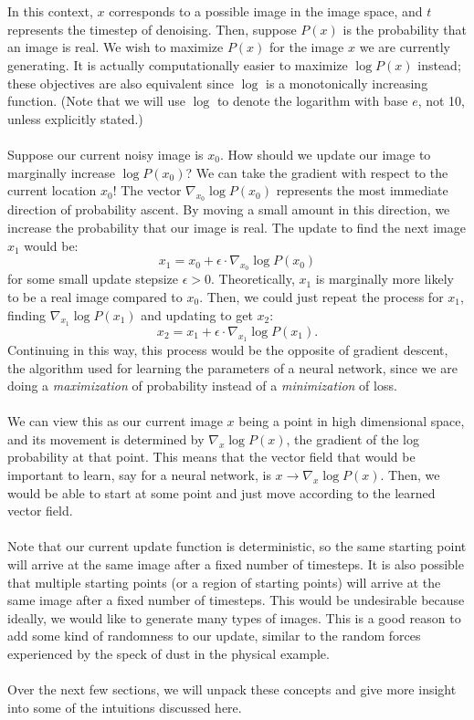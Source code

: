 \documentclass{article}
\begin{document}
\\
\\
In this context, $x$ corresponds to a possible image in the image space, and $t$ represents the timestep of denoising. Then, suppose $P(x)$ is the probability that an image is real. We wish to maximize $P(x)$ for the image $x$ we are currently generating. It is actually computationally easier to maximize $\log P(x)$ instead; these objectives are also equivalent since $\log$ is a monotonically increasing function. (Note that we will use $\log$ to denote the logarithm with base $e$, not 10, unless explicitly stated.)
\\
\\
Suppose our current noisy image is $x_0$. How should we update our image to marginally increase $\log P(x_0)$? We can take the gradient with respect to the current location $x_0$! The vector $\nabla_{x_0} \log P(x_0)$ represents the most immediate direction of probability ascent. By moving a small amount in this direction, we increase the probability that our image is real. The update to find the next image $x_1$ would be: 
\[x_1 = x_0 + \epsilon \cdot \nabla_{x_0} \log P(x_0)\]
for some small update stepsize $\epsilon > 0$. Theoretically, $x_1$ is marginally more likely to be a real image compared to $x_0$. Then, we could just repeat the process for $x_1$, finding $\nabla_{x_1} \log P(x_1)$ and updating to get $x_2$:
\[x_2 = x_1 + \epsilon \cdot \nabla_{x_1} \log P(x_1).\]
Continuing in this way, this process would be the opposite of gradient descent, the algorithm used for learning the parameters of a neural network, since we are doing a \textit{maximization} of probability instead of a \textit{minimization} of loss. 
\\
\\
We can view this as our current image $x$ being a point in high dimensional space, and its movement is determined by $\nabla_{x} \log P(x)$, the gradient of the log probability at that point. This means that the vector field that would be important to learn, say for a neural network, is $x\to \nabla_{x} \log P(x)$. Then, we would be able to start at some point and just move according to the learned vector field. 
\\
\\
Note that our current update function is deterministic, so the same starting point will arrive at the same image after a fixed number of timesteps. It is also possible that multiple starting points (or a region of starting points) will arrive at the same image after a fixed number of timesteps. This would be undesirable because ideally, we would like to generate many types of images. This is a good reason to add some kind of randomness to our update, similar to the random forces experienced by the speck of dust in the physical example. 
\\
\\
Over the next few sections, we will unpack these concepts and give more insight into some of the intuitions discussed here. 
\end{document}
